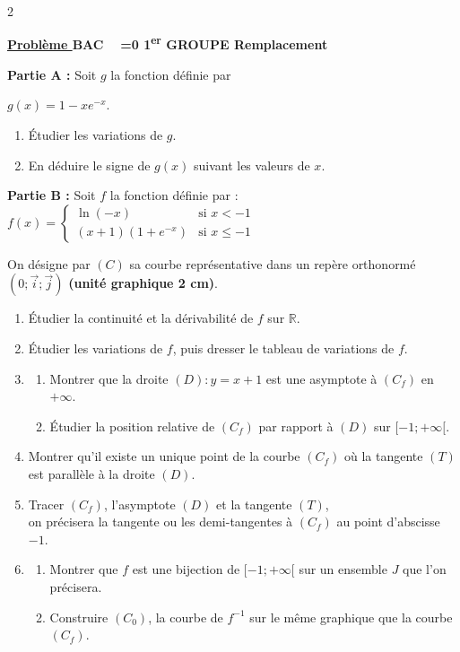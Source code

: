 \documentclass[12pt,a4paper]{article}
\newcounter{probleme}
\newcounter{annee}
\newcounter{session}
\newcommand{\exo}{%
    \refstepcounter{probleme}%
    \par\medskip
    \noindent\textbf{\underline{Problème \theprobleme}\quad
    BAC \theannee\ %
    \ifnum\value{session}=0
        1\textsuperscript{er} GROUPE%
        \setcounter{session}{1}%
    \else
        Remplacement%
        \setcounter{session}{0}%
        \stepcounter{annee}%
    \fi
    }
    \par\medskip
}
\begin{document}
\begin{multicols}{2}
\exo

\textbf{Partie A :} Soit \( g \) la fonction définie par 

\( g(x) = 1 - x e^{-x} \).

\begin{enumerate}
    \item Étudier les variations de \( g \).
    \item En déduire le signe de \( g(x) \) suivant les valeurs de \( x \).
\end{enumerate}

\textbf{Partie B :} Soit \( f \) la fonction définie par :\\
\(
f(x) =
\begin{cases}
\ln(-x) & \text{si } x < -1 \\
(x + 1)(1 + e^{-x}) & \text{si } x \leq -1
\end{cases}
\)

On désigne par \( (C) \) sa courbe représentative dans un repère orthonormé \( (0 ; \vec{i} ; \vec{j}) \) \textbf{(unité graphique 2 cm)}.

\begin{enumerate}
    \item Étudier la continuité et la dérivabilité de \( f \) sur \( \mathbb{R} \).

    \item Étudier les variations de \( f \), puis dresser le tableau de variations de \( f \).

    \item
    \begin{enumerate}
        \item Montrer que la droite \( (D) : y = x + 1 \) est une asymptote à \( (C_f) \) en \( +\infty \).
        \item Étudier la position relative de \( (C_f) \) par rapport à \( (D) \) sur \( [-1 ; +\infty[ \).
    \end{enumerate}

    \item Montrer qu’il existe un unique point de la courbe \( (C_f) \) où la tangente \( (T) \) est parallèle à la droite \( (D) \).

    \item Tracer \( (C_f) \), l’asymptote \( (D) \) et la tangente \( (T) \),\\
    on précisera la tangente ou les demi-tangentes à \( (C_f) \) au point d’abscisse \( -1 \).

    \item
    \begin{enumerate}
        \item Montrer que \( f \) est une bijection de \( [-1 ; +\infty[ \) sur un ensemble \( J \) que l’on précisera.
        \item Construire \( (C_0) \), la courbe de \( f^{-1} \) sur le même graphique que la courbe \( (C_f) \).
    \end{enumerate}
\end{enumerate}


\end{multicols}
\end{document}
